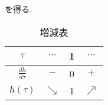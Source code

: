 を得る.
\begin{table}[bhtp]
\caption{増減表}
\label{tab:zougenhyo}
\centering
\begin{tabular}{c|ccc}
$\tau$&$\cdots$&1&$\cdots$\\
\hline
$\frac{dh}{d\tau}$&$-$&0&$+$\\
$h(\tau)$&$\searrow$&1&$\nearrow$
\end{tabular}
\end{table}
\begin{figure}[htbp]
  \begin{minipage}{0.5\hsize}
  \end{minipage}
  \begin{minipage}{0.5\hsize}
  \end{minipage}
\end{figure}
\newpage
\subsection{}